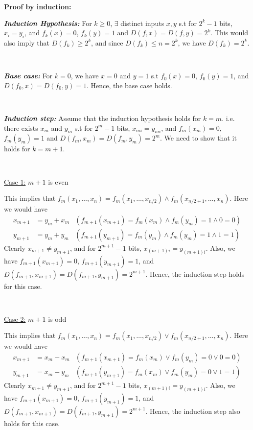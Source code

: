 \documentclass{article}
\begin{document}
\textbf{Proof by induction:}

\textit{\textbf{Induction Hypothesis:}} For $k \geq 0$, $\exists$ distinct inputs $x, y$ s.t for $2^k-1$ bits, $x_i = y_i$, and $f_k(x) = 0$, $f_k(y) = 1$ and $D(f, x) = D(f, y) = 2^k$. This would also imply that $D(f_k) \geq 2^k$, and since $D(f_k) \leq n = 2^k$, we have $D(f_k) = 2^k$. 

\,

\textit{\textbf{Base case:}} For $k = 0$, we have $x = 0$ and $y = 1$ s.t $f_0(x) = 0$, $f_0(y) = 1$, and $D(f_0, x) = D(f_0, y) = 1$. Hence, the base case holds.

\,

\textit{\textbf{Induction step:}} Assume that the induction hypothesis holds for $k = m$. i.e. there exists $x_m$ and $y_m$ s.t for $2^m-1$ bits, $x_{mi} = y_{mi}$, and $f_m(x_m) = 0$, $f_m(y_m) = 1$ and $D(f_m, x_m) = D(f_m, y_m) = 2^m$.
We need to show that it holds for $k = m + 1$.

\,

\noindent
\underline{Case 1:} $m + 1$ is even

This implies that $f_m(x_1, \ldots, x_n) = f_m(x_1, \ldots, x_{n/2}) \land f_m(x_{n/2+1}, \ldots, x_n)$. Here we would have 
\begin{align*}	
	x_{m+1} &= y_m + x_m & (f_{m+1}(x_{m+1}) = f_{m}(x_m) \land f_{m}(y_m) = 1 \land 0 = 0) \\
	y_{m+1} &= y_m + y_m & (f_{m+1}(y_{m+1}) = f_{m}(y_m) \land f_{m}(y_m) = 1 \land 1 = 1)
\end{align*}
Clearly $x_{m+1} \neq y_{m+1}$, and for $2^{m+1}-1$ bits, $x_{(m+1)i} = y_{(m+1)i}$. Also, we have $f_{m+1}(x_{m+1}) = 0$, $f_{m+1}(y_{m+1}) = 1$, and $D(f_{m+1}, x_{m+1}) = D(f_{m+1}, y_{m+1}) = 2^{m+1}$. Hence, the induction step holds for this case.

\,

\noindent
\underline{Case 2:} $m + 1$ is odd

This implies that $f_m(x_1, \ldots, x_n) = f_m(x_1, \ldots, x_{n/2}) \lor f_m(x_{n/2+1}, \ldots, x_n)$. Here we would have
\begin{align*}
	x_{m+1} &= x_m + x_m & (f_{m+1}(x_{m+1}) = f_{m}(x_m) \lor f_{m}(y_m) = 0 \lor 0 = 0) \\
	y_{m+1} &= x_m + y_m & (f_{m+1}(y_{m+1}) = f_{m}(x_m) \lor f_{m}(y_m) = 0 \lor 1 = 1)
\end{align*}
Clearly $x_{m+1} \neq y_{m+1}$, and for $2^{m+1}-1$ bits, $x_{(m+1)i} = y_{(m+1)i}$. Also, we have $f_{m+1}(x_{m+1}) = 0$, $f_{m+1}(y_{m+1}) = 1$, and $D(f_{m+1}, x_{m+1}) = D(f_{m+1}, y_{m+1}) = 2^{m+1}$. Hence, the induction step also holds for this case.
\end{document}

